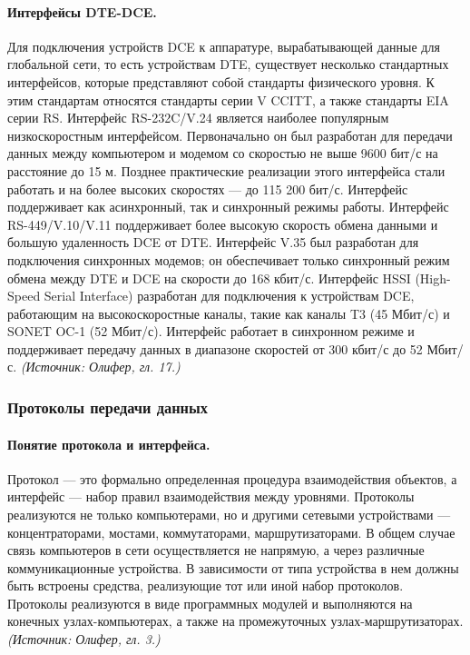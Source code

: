 \documentclass[a4paper,12pt]{article}
\begin{document}
\paragraph{Интерфейсы DTE-DCE.}
Для подключения устройств DCE к аппаратуре, вырабатывающей данные для глобальной сети, то есть устройствам DTE, существует несколько стандартных интерфейсов, которые представляют собой стандарты физического уровня. К этим стандартам относятся стандарты серии V CCITT, а также стандарты EIA серии RS. Интерфейс RS-232C/V.24 является наиболее популярным низкоскоростным интерфейсом. Первоначально он был разработан для передачи данных между компьютером и модемом со скоростью не выше 9600 бит/с на расстояние до 15 м. Позднее практические реализации этого интерфейса стали работать и на более высоких скоростях — до 115 200 бит/с. Интерфейс поддерживает как асинхронный, так и синхронный режимы работы. Интерфейс RS-449/V.10/V.11 поддерживает более высокую скорость обмена данными и большую удаленность DCE от DTE. Интерфейс V.35 был разработан для подключения синхронных модемов; он обеспечивает только синхронный режим обмена между DTE и DCE на скорости до 168 кбит/с. Интерфейс HSSI (High-Speed Serial Interface) разработан для подключения к устройствам DCE, работающим на высокоскоростные каналы, такие как каналы T3 (45 Мбит/с) и SONET OC-1 (52 Мбит/с). Интерфейс работает в синхронном режиме и поддерживает передачу данных в диапазоне скоростей от 300 кбит/с до 52 Мбит/с.
\textit{(Источник: Олифер, гл. 17.)}

\subsubsection{Протоколы передачи данных}

\paragraph{Понятие протокола и интерфейса.}
Протокол — это формально определенная процедура взаимодействия объектов, а интерфейс — набор правил взаимодействия между уровнями. Протоколы реализуются не только компьютерами, но и другими сетевыми устройствами — концентраторами, мостами, коммутаторами, маршрутизаторами. В общем случае связь компьютеров в сети осуществляется не напрямую, а через различные коммуникационные устройства. В зависимости от типа устройства в нем должны быть встроены средства, реализующие тот или иной набор протоколов. Протоколы реализуются в виде программных модулей и выполняются на конечных узлах-компьютерах, а также на промежуточных узлах-маршрутизаторах.
\textit{(Источник: Олифер, гл. 3.)}
\end{document}
